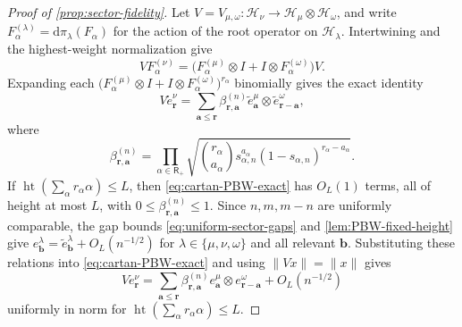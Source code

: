 \documentclass[11pt]{article}
\theoremstyle{remark}
\theoremstyle{plain}
\newcommand{\cH}{\mathcal H}
\newcommand{\dd}{\mathrm d}
\newcommand{\ot}{\otimes}
\begin{document}
\begin{proof}[Proof of \cref{prop:sector-fidelity}]
Let
\(V=V_{\mu,\omega}:\cH_\nu\to\cH_\mu\ot\cH_\omega\), and write
\(F_\alpha^{(\lambda)}=\dd\pi_\lambda(F_\alpha)\) for the action of the root
operator on \(\cH_\lambda\).  Intertwining and the highest-weight
normalization give
\[
  VF_\alpha^{(\nu)}
  =\bigl(F_\alpha^{(\mu)}\ot I+I\ot F_\alpha^{(\omega)}\bigr)V.
\]
Expanding each
\(\bigl(F_\alpha^{(\mu)}\ot I+I\ot F_\alpha^{(\omega)}\bigr)^{r_\alpha}\)
binomially gives the exact identity
\begin{equation}\label{eq:cartan-PBW-exact}
  V\widetilde e_{\mathbf r}^{\nu}
  =\sum_{\mathbf a\le\mathbf r}
    \beta_{\mathbf r,\mathbf a}^{(n)}
    \widetilde e_{\mathbf a}^{\mu}
    \ot\widetilde e_{\mathbf r-\mathbf a}^{\omega},
\end{equation}
where
\begin{equation}\label{eq:cartan-coefficients}
  \beta_{\mathbf r,\mathbf a}^{(n)}
  =\prod_{\alpha\in\mathsf R_+}
   \sqrt{\binom{r_\alpha}{a_\alpha}
   s_{\alpha,n}^{a_\alpha}
   (1-s_{\alpha,n})^{r_\alpha-a_\alpha}}.
\end{equation}
If \(\operatorname{ht}(\sum_\alpha r_\alpha\alpha)\le L\),
then \eqref{eq:cartan-PBW-exact} has \(O_L(1)\) terms, all of height at
most \(L\), with
\(0\le\beta_{\mathbf r,\mathbf a}^{(n)}\le1\).
Since \(n,m,m-n\) are uniformly comparable, the gap bounds
\eqref{eq:uniform-sector-gaps} and \cref{lem:PBW-fixed-height} give
\(e_{\mathbf b}^{\lambda}=\widetilde e_{\mathbf b}^{\lambda}
+O_L(n^{-1/2})\) for \(\lambda\in\{\mu,\nu,\omega\}\) and all relevant
\(\mathbf b\).  Substituting these relations into
\eqref{eq:cartan-PBW-exact} and using \(\|Vx\|=\|x\|\) gives
\begin{equation}\label{eq:cartan-orthonormal-fixed-height}
  Ve_{\mathbf r}^{\nu}
  =\sum_{\mathbf a\le\mathbf r}
    \beta_{\mathbf r,\mathbf a}^{(n)}
    e_{\mathbf a}^{\mu}\ot e_{\mathbf r-\mathbf a}^{\omega}
    +O_L(n^{-1/2})
\end{equation}
uniformly in norm for
\(\operatorname{ht}(\sum_\alpha r_\alpha\alpha)\le L\).


\end{proof}
\end{document}
